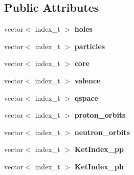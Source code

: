 \subsection*{Public Attributes}
\begin{DoxyCompactItemize}
\item 
vector$<$ index\+\_\+t $>$ {\bfseries holes}\hypertarget{classModelSpace_a540070f4df481d7fb5862d9c392e73c3}{}\label{classModelSpace_a540070f4df481d7fb5862d9c392e73c3}

\item 
vector$<$ index\+\_\+t $>$ {\bfseries particles}\hypertarget{classModelSpace_a5e3511a14dcd3cea30815de14100812c}{}\label{classModelSpace_a5e3511a14dcd3cea30815de14100812c}

\item 
vector$<$ index\+\_\+t $>$ {\bfseries core}\hypertarget{classModelSpace_add553fdd38ad3a9af34d91acc5dee84d}{}\label{classModelSpace_add553fdd38ad3a9af34d91acc5dee84d}

\item 
vector$<$ index\+\_\+t $>$ {\bfseries valence}\hypertarget{classModelSpace_a2cb4a1691177ce70d7e538866b3adf2a}{}\label{classModelSpace_a2cb4a1691177ce70d7e538866b3adf2a}

\item 
vector$<$ index\+\_\+t $>$ {\bfseries qspace}\hypertarget{classModelSpace_ae50f91078466cce0d733a72f38187dae}{}\label{classModelSpace_ae50f91078466cce0d733a72f38187dae}

\item 
vector$<$ index\+\_\+t $>$ {\bfseries proton\+\_\+orbits}\hypertarget{classModelSpace_a2a2c23a13d4eb11098e0d34ff7f88649}{}\label{classModelSpace_a2a2c23a13d4eb11098e0d34ff7f88649}

\item 
vector$<$ index\+\_\+t $>$ {\bfseries neutron\+\_\+orbits}\hypertarget{classModelSpace_ae4fbf4fb5c2dee1f1d572e3d35708948}{}\label{classModelSpace_ae4fbf4fb5c2dee1f1d572e3d35708948}

\item 
vector$<$ index\+\_\+t $>$ {\bfseries Ket\+Index\+\_\+pp}\hypertarget{classModelSpace_a52b5044ad3b3040cf7a84ddca14a4f0e}{}\label{classModelSpace_a52b5044ad3b3040cf7a84ddca14a4f0e}

\item 
vector$<$ index\+\_\+t $>$ {\bfseries Ket\+Index\+\_\+ph}\hypertarget{classModelSpace_ac9e07e40e307b3c0a2d9c2cb20089aa2}{}\label{classModelSpace_ac9e07e40e307b3c0a2d9c2cb20089aa2}


\end{DoxyCompactItemize}

